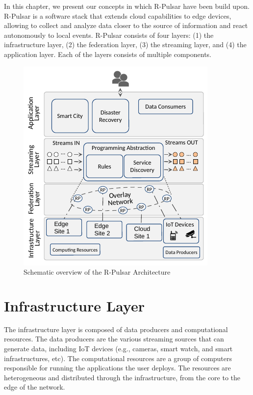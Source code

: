 In this chapter, we present our concepts in which R-Pulsar have been build upon. R-Pulsar is a software stack that extends cloud capabilities to edge devices, allowing to collect and analyze data closer to the source of information and react autonomously to local events. R-Pulsar consists of four layers: (1) the infrastructure layer, (2) the federation layer, (3) the streaming layer, and (4) the application layer. Each of the layers consists of multiple components.

\begin{figure}[!h]
  \centering
  \includegraphics[width=0.7\columnwidth]{Figures/R-PulsarArch.pdf}
  \caption{Schematic overview of the R-Pulsar Architecture}\label{fig:R-PulsarArch}
\end{figure}


\section{Infrastructure Layer}
The infrastructure layer is composed of data producers and computational resources. The data producers are the various streaming sources that can generate data, including IoT devices (e.g., cameras, smart watch, and smart infrastructures, etc). The computational resources are a group of computers responsible for running the applications the user deploys. The resources are heterogeneous and distributed through the infrastructure, from the core to the edge of the network. 

